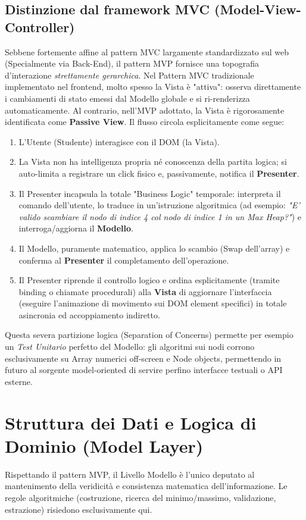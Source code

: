 \documentclass[openany]{theme/uniprthesis}
\begin{document}
\subsection{Distinzione dal framework MVC (Model-View-Controller)}
Sebbene fortemente affine al pattern MVC largamente standardizzato sul web (Specialmente via Back-End), il pattern MVP fornisce una topografia d'interazione \textit{strettamente gerarchica}.
Nel Pattern MVC tradizionale implementato nel frontend, molto spesso la Vista è "attiva": osserva direttamente i cambiamenti di stato emessi dal Modello globale e si ri-renderizza automaticamente.
Al contrario, nell'MVP adottato, la Vista è rigorosamente identificata come \textbf{Passive View}. Il flusso circola esplicitamente come segue:
\begin{enumerate}
    \item L'Utente (Studente) interagisce con il DOM (la Vista).
    \item La Vista non ha intelligenza propria né conoscenza della partita logica; si auto-limita a registrare un click fisico e, passivamente, notifica il \textbf{Presenter}.
    \item Il Presenter incapsula la totale "Business Logic" temporale: interpreta il comando dell'utente, lo traduce in un'istruzione algoritmica (ad esempio: \textit{"E' valido scambiare il nodo di indice 4 col nodo di indice 1 in un Max Heap?"}) e interroga/aggiorna il \textbf{Modello}.
    \item Il Modello, puramente matematico, applica lo scambio (Swap dell'array) e conferma al \textbf{Presenter} il completamento dell'operazione.
    \item Il Presenter riprende il controllo logico e ordina esplicitamente (tramite binding o chiamate procedurali) alla \textbf{Vista} di aggiornare l'interfaccia (eseguire l'animazione di movimento sui DOM element specifici) in totale asincronia ed accoppiamento indiretto.
\end{enumerate}

Questa severa partizione logica (Separation of Concerns) permette per esempio un \textit{Test Unitario} perfetto del Modello: gli algoritmi sui nodi corrono esclusivamente su Array numerici off-screen e Node objects, permettendo in futuro al sorgente model-oriented di servire perfino interfacce testuali o API esterne.

\section{Struttura dei Dati e Logica di Dominio (Model Layer)}
Rispettando il pattern MVP, il Livello Modello è l'unico deputato al mantenimento della veridicità e consistenza matematica dell'informazione. Le regole algoritmiche (costruzione, ricerca del minimo/massimo, validazione, estrazione) risiedono esclusivamente qui.
\end{document}
